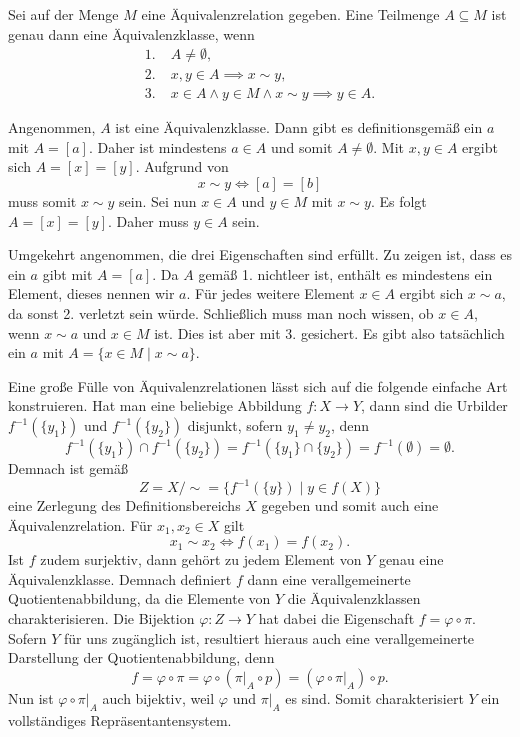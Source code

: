 \begin{Satz}\newlinefirst
Sei auf der Menge $M$ eine Äquivalenzrelation gegeben. Eine
Teilmenge $A\subseteq M$ ist genau dann eine Äquivalenzklasse,
wenn%
\begin{align*}
1.\;& A\ne\emptyset,\\
2.\;& x,y\in A\implies x\sim y,\\
3.\;& x\in A\land y\in M\land x\sim y\implies y\in A.
\end{align*}
\end{Satz}
 Angenommen, $A$ ist eine Äquivalenzklasse.
Dann gibt es definitionsgemäß ein $a$ mit $A=[a]$. Daher ist
mindestens $a\in A$ und somit $A\ne\emptyset$. Mit $x,y\in A$ ergibt
sich $A=[x]=[y]$. Aufgrund von%
\[x\sim y \iff [a]=[b]\]
muss somit $x\sim y$ sein. Sei nun $x\in A$ und $y\in M$ mit
$x\sim y$. Es folgt $A=[x]=[y]$. Daher muss $y\in A$ sein.

Umgekehrt angenommen, die drei Eigenschaften sind erfüllt.
Zu zeigen ist, dass es ein $a$ gibt mit $A=[a]$. Da $A$ gemäß 1.
nichtleer ist, enthält es mindestens ein Element, dieses nennen wir
$a$. Für jedes weitere Element $x\in A$ ergibt sich
$x\sim a$, da sonst 2. verletzt sein würde. Schließlich muss man
noch wissen, ob $x\in A$, wenn $x\sim a$ und $x\in M$ ist.
Dies ist aber mit 3. gesichert. Es gibt also
tatsächlich ein $a$ mit $A=\{x\in M\mid x\sim a\}$.\;\qedsymbol

Eine große Fülle von Äquivalenzrelationen lässt sich auf die folgende
einfache Art konstruieren. Hat man eine beliebige Abbildung
$f\colon X\to Y$, dann sind die Urbilder $f^{-1}(\{y_1\})$ und
$f^{-1}(\{y_2\})$ disjunkt, sofern $y_1\ne y_2$, denn%
\[f^{-1}(\{y_1\})\cap f^{-1}(\{y_2\}) = f^{-1}(\{y_1\}\cap\{y_2\})
= f^{-1}(\emptyset) = \emptyset.\]
Demnach ist gemäß
\[Z = X/{\sim} = \{f^{-1}(\{y\})\mid y\in f(X)\}\]
eine Zerlegung des Definitionsbereichs $X$ gegeben und somit auch eine
Äquivalenzrelation. Für $x_1,x_2\in X$ gilt%
\[x_1\sim x_2 \iff f(x_1) = f(x_2).\]
Ist $f$ zudem surjektiv, dann gehört zu jedem Element von $Y$ genau eine
Äquivalenzklasse. Demnach definiert $f$ dann eine verallgemeinerte
Quotientenabbildung, da die Elemente von $Y$ die Äquivalenzklassen
charakterisieren. Die Bijektion $\varphi\colon Z\to Y$ hat dabei
die Eigenschaft $f = \varphi\circ\pi$. Sofern $Y$ für uns zugänglich
ist, resultiert hieraus auch eine verallgemeinerte Darstellung der
Quotientenabbildung, denn
\[f = \varphi\circ\pi = \varphi\circ (\pi|_A\circ p)
= (\varphi\circ\pi|_A)\circ p.\]
Nun ist $\varphi\circ\pi|_A$ auch bijektiv, weil $\varphi$
und $\pi|_A$ es sind. Somit charakterisiert $Y$ ein
vollständiges Repräsentantensystem.

